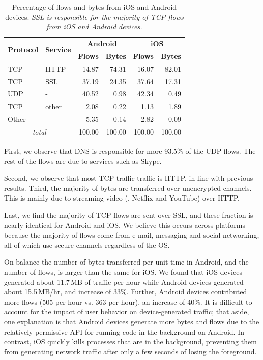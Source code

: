 \begin{table}
\begin{center}
\begin{tabular}{|l|l|r|r|r|r|}
\hline
\multirow{2}{*}{\bf Protocol} & \multirow{2}{*}{\bf Service} & \multicolumn{2}{|c|}{\bf Android} & \multicolumn{2}{|c|}{\bf iOS} \tabularnewline
\cline{3-6}
           &           &  \textbf{Flows}  &  \textbf{Bytes}  &  \textbf{Flows}  &  \textbf{Bytes}  \tabularnewline
\hline
 TCP       &  HTTP     &  14.87  &  74.31  &  16.07  &  82.01  \tabularnewline
\hline
TCP       &  SSL      &  37.19  &  24.35  &  37.64  &  17.31  \tabularnewline
\hline
 UDP       &  -        &  40.52  &   0.98  &  42.34  &   0.49  \tabularnewline
\hline
 TCP       &  other    &   2.08  &   0.22  &   1.13  &   1.89  \tabularnewline
\hline
 Other     &  -        &   5.35  &   0.14  &   2.82  &   0.09  \tabularnewline
\hline
\multicolumn{2}{|c|}{\emph{total}} & 100.00 & 100.00 & 100.00 & 100.00 \tabularnewline
\hline
\end{tabular}
\end{center}
\caption{Percentage of flows and bytes from iOS and Android devices.  \emph{SSL is responsible for the majority of
    TCP flows from iOS and Android devices.}} 
\label{tab:summaryIOSAndroidTraffic}
\end{table}

First, we observe that DNS is responsible for more 93.5\% of
the UDP flows. The rest of the flows are due to services such as
Skype. 

Second, we observe that most TCP traffic
traffic is HTTP, in line with previous results. Third, the majority 
of bytes are transferred over unencrypted channels. This is mainly 
due to streaming video (\eg, Netflix and YouTube) over HTTP. 

Last, we find the majority 
of TCP flows are sent over SSL, and these fraction is nearly identical 
for Android and iOS. We believe this occurs across platforms because 
the majority of flows come from e-mail, messaging and social networking, 
all of which use secure channels regardless of the OS.  

On balance the number of bytes transferred per unit time in Android, 
and the number of flows, is larger than the same for iOS. We found that iOS 
devices generated about 11.7\,MB of traffic per hour while Android devices 
generated about 15.5\,MB/hr, and increase of 33\%. Further, Android devices 
contributed more flows (505 per hour vs. 363 per hour), an increase of 40\%. 
It is difficult to account for the impact of user behavior on device-generated 
traffic; that aside, one explanation is that Android devices generate more 
bytes and flows due to the relatively permissive API for running code in the 
background on Android. In contrast, iOS quickly kills processes that 
are in the background, preventing them from generating network 
traffic after only a few seconds of losing the foreground.

